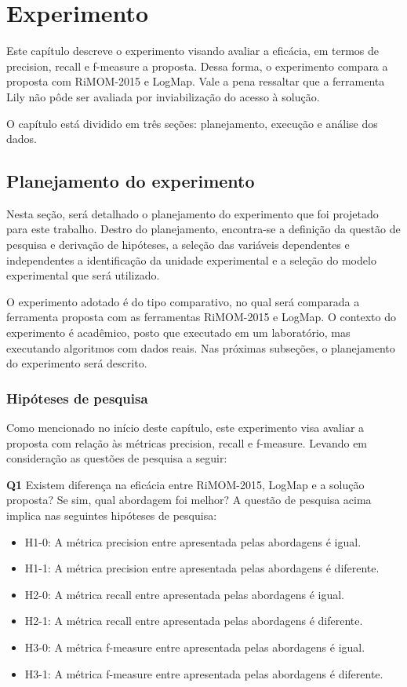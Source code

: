 \chapter{Experimento}
Este capítulo descreve o experimento visando avaliar a eficácia, em termos de precision, recall e f-measure \cite{goutte2005probabilistic} a proposta. Dessa forma,  o experimento compara a proposta com RiMOM-2015 e LogMap. Vale a pena ressaltar que a ferramenta Lily não pôde ser avaliada por inviabilização do acesso à solução.

O capítulo está dividido em três seções: planejamento, execução e análise dos dados. 

\section{Planejamento do experimento}

Nesta seção, será detalhado o planejamento do experimento que foi projetado para este trabalho. Destro do planejamento, encontra-se a definição da questão de pesquisa e derivação de hipóteses, a seleção das variáveis dependentes e independentes a identificação da unidade experimental e a seleção do modelo experimental que será utilizado.

O experimento adotado é do tipo comparativo, no qual será comparada a ferramenta proposta com as ferramentas RiMOM-2015 e LogMap. O contexto do experimento é acadêmico, posto que executado em um laboratório, mas executando algoritmos com dados reais. Nas próximas subseções, o planejamento do experimento será descrito.

\subsection{Hipóteses de pesquisa}

Como mencionado no início deste capítulo, este experimento visa avaliar a proposta com relação às métricas precision, recall e f-measure. Levando em consideração as questões de pesquisa a seguir:

\textbf{Q1} Existem diferença na eficácia entre RiMOM-2015, LogMap e a solução proposta? Se sim, qual abordagem foi melhor?
A questão de pesquisa acima implica nas seguintes hipóteses de pesquisa:

\begin{itemize}
\item H1-0: A métrica precision entre apresentada pelas abordagens é igual.
\item H1-1: A métrica precision entre apresentada pelas abordagens é diferente.
\item H2-0: A métrica recall entre apresentada pelas abordagens é igual.
\item H2-1: A métrica recall entre apresentada pelas abordagens é diferente.
\item H3-0: A métrica f-measure entre apresentada pelas abordagens é igual.
\item H3-1: A métrica f-measure entre apresentada pelas abordagens é diferente.
\end{itemize}

